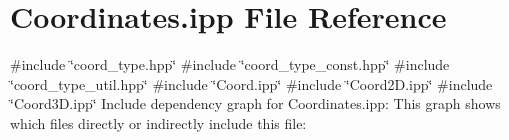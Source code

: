 \hypertarget{Coordinates_8ipp}{}\section{Coordinates.\+ipp File Reference}
\label{Coordinates_8ipp}
{\ttfamily \#include \char`\"{}coord\+\_\+type.\+hpp\char`\"{}}\newline
{\ttfamily \#include \char`\"{}coord\+\_\+type\+\_\+const.\+hpp\char`\"{}}\newline
{\ttfamily \#include \char`\"{}coord\+\_\+type\+\_\+util.\+hpp\char`\"{}}\newline
{\ttfamily \#include \char`\"{}Coord.\+ipp\char`\"{}}\newline
{\ttfamily \#include \char`\"{}Coord2\+D.\+ipp\char`\"{}}\newline
{\ttfamily \#include \char`\"{}Coord3\+D.\+ipp\char`\"{}}\newline
Include dependency graph for Coordinates.\+ipp\+:
This graph shows which files directly or indirectly include this file\+:
